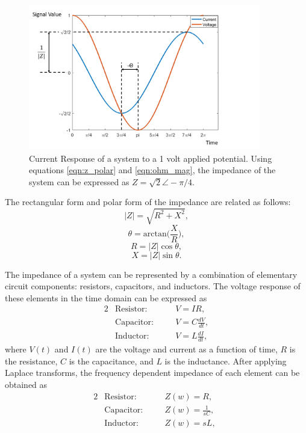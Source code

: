  \begin{figure}[ht]
    \centering
    \includegraphics[width=0.9\textwidth]{images/ac_signal.png}
    \caption[Current Response of a system to an applied voltage]{Current Response of a system to a 1 volt applied potential. Using equations \ref{eqn:z_polar} and \ref{eqn:ohm_mag}, the impedance of the system can be expressed as $Z=\sqrt{2}\angle -\pi/4$.} 
    \label{fig:ac_signal}
 \end{figure}
 
 \par The rectangular form and polar form of the impedance are related as follows:
 \begin{equation}
     |Z| = \sqrt{R^2 + X^2},
 \end{equation}
 \begin{equation}
    \theta = \text{arctan}\Big(\frac{X}{R}\Big),
 \end{equation}
 \begin{equation}
    R = |Z|\cos\theta,
 \end{equation}
 \begin{equation}
     X = |Z|\sin\theta.
 \end{equation}
 
 \par The impedance of a system can be represented by a combination of elementary circuit components: resistors, capacitors, and inductors. The voltage response of these elements in the time domain can be expressed as
 \begin{alignat}{2}
    &\text{Resistor:} \quad  &&V = IR, \label{eqn:ohms_law}\\
    &\text{Capacitor:} \quad &&V = C \frac{dV}{dt},\\
    &\text{Inductor:} \quad  &&V = L \frac{dI}{dt},
 \end{alignat}
 \noindent where $V(t)$ and $I(t)$ are the voltage and current as a function of time, $R$ is the resistance, $C$ is the capacitance, and $L$ is the inductance. After applying Laplace transforms, the frequency dependent impedance of each element can be obtained as
  \begin{alignat}{2}
    &\text{Resistor:} \quad  &&Z(w) = R, \;\;\;\\
    &\text{Capacitor:} \quad &&Z(w) = \frac{1}{sC},\\
    &\text{Inductor:} \quad  &&Z(w) = sL,
 \end{alignat}
 
